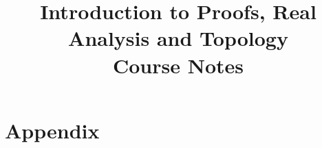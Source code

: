 

\title{Introduction to Proofs, Real Analysis and Topology\\[4pt]\large Course Notes}
\author{}
\date{}


\maketitle
\tableofcontents


























\appendix
\part{Appendix}



